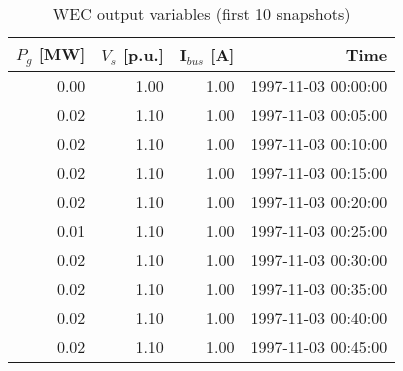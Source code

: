 \begin{table}
\centering
\caption{WEC output variables (first 10 snapshots)}
\label{tab:wec_outputs}
\begin{tabular}{rrrr}
\toprule
 $P_g$ [MW] &  $V_s$ [p.u.] &  I$_{bus}$ [A] &                Time \\
\midrule
       0.00 &          1.00 &           1.00 & 1997-11-03 00:00:00 \\
       0.02 &          1.10 &           1.00 & 1997-11-03 00:05:00 \\
       0.02 &          1.10 &           1.00 & 1997-11-03 00:10:00 \\
       0.02 &          1.10 &           1.00 & 1997-11-03 00:15:00 \\
       0.02 &          1.10 &           1.00 & 1997-11-03 00:20:00 \\
       0.01 &          1.10 &           1.00 & 1997-11-03 00:25:00 \\
       0.02 &          1.10 &           1.00 & 1997-11-03 00:30:00 \\
       0.02 &          1.10 &           1.00 & 1997-11-03 00:35:00 \\
       0.02 &          1.10 &           1.00 & 1997-11-03 00:40:00 \\
       0.02 &          1.10 &           1.00 & 1997-11-03 00:45:00 \\
\bottomrule
\end{tabular}
\end{table}
